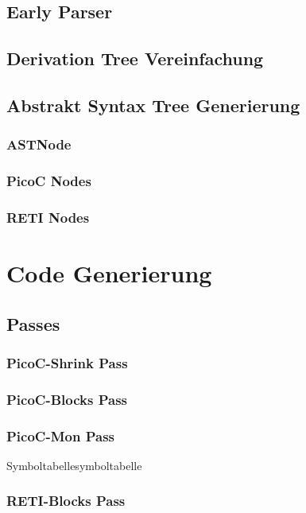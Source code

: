 \subsection{Early Parser}
\subsection{Derivation Tree Vereinfachung}
\subsection{Abstrakt Syntax Tree Generierung}
\subsubsection{ASTNode}
\subsubsection{PicoC Nodes}
\subsubsection{RETI Nodes}
\section{Code Generierung}
\subsection{Passes}
\subsubsection{PicoC-Shrink Pass}
\subsubsection{PicoC-Blocks Pass}
\subsubsection{PicoC-Mon Pass}
\begin{Definition}{Symboltabelle}{symboltabelle}
\end{Definition}
\subsubsection{RETI-Blocks Pass}
